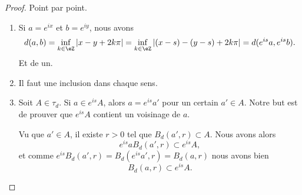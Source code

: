 \begin{proof}
    Point par point.
    \begin{enumerate}
        \item
            Si \( a= e^{ix}\) et \( b= e^{iy}\), nous avons
            \begin{equation}
                d(a,b)=\inf_{k\in \eZ}| x-y+2k\pi |=\inf_{k\in \eZ}| (x-s)-(y-s)+2k\pi |=d( e^{is}a, e^{is}b).
            \end{equation}
            Et de un.
        \item
            Il faut une inclusion dans chaque sens.
        \item
            Soit \( A\in\tau_d\). Si \( a\in  e^{is}A\), alors \( a= e^{is}a'\) pour un certain \( a'\in A\). Notre but est de prouver que \(  e^{is}A\) contient un voisinage de \( a\).

            Vu que \( a'\in A\), il existe \( r>0\) tel que \( B_d(a',r)\subset A\). Nous avons alors
            \begin{equation}
                e^{is}aB_d(a',r)\subset  e^{is}A,
            \end{equation}
            et comme \(  e^{is}B_d(a',r)=B_d( e^{is}a',r)=B_d(a,r)\) nous avons bien
            \begin{equation}
                B_d(a,r)\subset  e^{is}A.
            \end{equation}
    \end{enumerate}
\end{proof}

